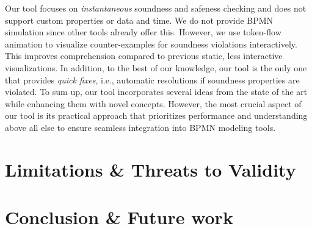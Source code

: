 \documentclass[runningheads]{llncs}
\begin{document}
Our tool focuses on \textit{instantaneous} soundness and safeness checking and does not support custom properties or data and time.
We do not provide BPMN simulation since other tools already offer this.
However, we use token-flow animation to visualize counter-examples for soundness violations interactively.
This improves comprehension compared to previous static, less interactive visualizations.
In addition, to the best of our knowledge, our tool is the only one that provides \textit{quick fixes}, i.e., automatic resolutions if soundness properties are violated.
To sum up, our tool incorporates several ideas from the state of the art while enhancing them with novel concepts.
However, the most crucial aspect of our tool is its practical approach that prioritizes performance and understanding above all else to ensure seamless integration into BPMN modeling tools.

\section{Limitations \& Threats to Validity}


\section{Conclusion \& Future work}





\end{document}
